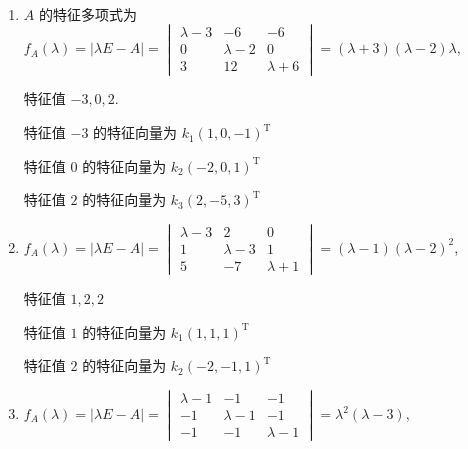      \paragraph{} %
         \begin{enumerate}
             \item %
                   \( A \) 的特征多项式为 \( f_{A}(\lambda) = |\lambda E - A| = \begin{vmatrix}
                       \lambda - 3 & -6          & -6          \\
                       0           & \lambda - 2 & 0           \\
                       3           & 12          & \lambda + 6
                   \end{vmatrix} = (\lambda + 3)(\lambda - 2)\lambda \),

                   特征值 \( -3, 0, 2 \).

                   特征值 \( -3 \) 的特征向量为 \( k_1(1, 0, -1)^{\mathrm{T}} \)

                   特征值 \( 0 \) 的特征向量为 \( k_2(-2, 0, 1)^{\mathrm{T}} \)

                   特征值 \( 2 \) 的特征向量为 \( k_3(2, -5, 3)^{\mathrm{T}} \)
             \item %
                   \( f_{A}(\lambda) = |\lambda E - A| = \begin{vmatrix}
                       \lambda - 3 & 2           & 0           \\
                       1           & \lambda - 3 & 1           \\
                       5           & -7          & \lambda + 1
                   \end{vmatrix} = (\lambda - 1)(\lambda - 2)^{2} \),

                   特征值 \( 1, 2, 2 \)

                   特征值 \( 1 \) 的特征向量为 \( k_1(1, 1, 1)^{\mathrm{T}} \)

                   特征值 \( 2 \) 的特征向量为 \( k_2(-2, -1, 1)^{\mathrm{T}} \)
             \item %
                   \( f_{A}(\lambda) = |\lambda E - A| = \begin{vmatrix}
                       \lambda - 1 & -1          & -1          \\
                       -1          & \lambda - 1 & -1          \\
                       -1          & -1          & \lambda - 1
                   \end{vmatrix} = \lambda^{2}(\lambda - 3) \),


\end{enumerate}
